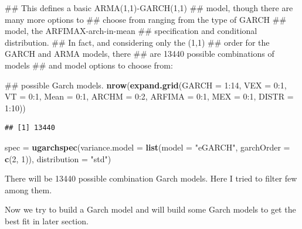 \documentclass[]{tufte-book}
\newenvironment{Shaded}{}{}
\newcommand{\KeywordTok}[1]{\textcolor[rgb]{0.00,0.44,0.13}{\textbf{#1}}}
\newcommand{\DataTypeTok}[1]{\textcolor[rgb]{0.56,0.13,0.00}{#1}}
\newcommand{\DecValTok}[1]{\textcolor[rgb]{0.25,0.63,0.44}{#1}}
\newcommand{\StringTok}[1]{\textcolor[rgb]{0.25,0.44,0.63}{#1}}
\newcommand{\OperatorTok}[1]{\textcolor[rgb]{0.40,0.40,0.40}{#1}}
\newcommand{\NormalTok}[1]{#1}
\begin{document}
\begin{Shaded}
\begin{Highlighting}[]
\NormalTok{## This defines a basic ARMA(1,1)-GARCH(1,1)}
\NormalTok{## model, though there are many more options to}
\NormalTok{## choose from ranging from the type of GARCH}
\NormalTok{## model, the ARFIMAX-arch-in-mean}
\NormalTok{## specification and conditional distribution.}
\NormalTok{## In fact, and considering only the (1,1)}
\NormalTok{## order for the GARCH and ARMA models, there}
\NormalTok{## are 13440 possible combinations of models}
\NormalTok{## and model options to choose from:}

\NormalTok{## possible Garch models.}
\KeywordTok{nrow}\NormalTok{(}\KeywordTok{expand.grid}\NormalTok{(}\DataTypeTok{GARCH =} \DecValTok{1}\OperatorTok{:}\DecValTok{14}\NormalTok{, }\DataTypeTok{VEX =} \DecValTok{0}\OperatorTok{:}\DecValTok{1}\NormalTok{, }\DataTypeTok{VT =} \DecValTok{0}\OperatorTok{:}\DecValTok{1}\NormalTok{, }
    \DataTypeTok{Mean =} \DecValTok{0}\OperatorTok{:}\DecValTok{1}\NormalTok{, }\DataTypeTok{ARCHM =} \DecValTok{0}\OperatorTok{:}\DecValTok{2}\NormalTok{, }\DataTypeTok{ARFIMA =} \DecValTok{0}\OperatorTok{:}\DecValTok{1}\NormalTok{, }\DataTypeTok{MEX =} \DecValTok{0}\OperatorTok{:}\DecValTok{1}\NormalTok{, }
    \DataTypeTok{DISTR =} \DecValTok{1}\OperatorTok{:}\DecValTok{10}\NormalTok{))}
\end{Highlighting}
\end{Shaded}

\begin{verbatim}
## [1] 13440
\end{verbatim}

\begin{Shaded}
\begin{Highlighting}[]
\NormalTok{spec =}\StringTok{ }\KeywordTok{ugarchspec}\NormalTok{(}\DataTypeTok{variance.model =} \KeywordTok{list}\NormalTok{(}\DataTypeTok{model =} \StringTok{"eGARCH"}\NormalTok{, }
    \DataTypeTok{garchOrder =} \KeywordTok{c}\NormalTok{(}\DecValTok{2}\NormalTok{, }\DecValTok{1}\NormalTok{)), }\DataTypeTok{distribution =} \StringTok{"std"}\NormalTok{)}
\end{Highlighting}
\end{Shaded}

There will be 13440 possible combination Garch models. Here I tried to
filter few among them.

Now we try to build a Garch model and will build some Garch models to
get the best fit in later section.
\end{document}
